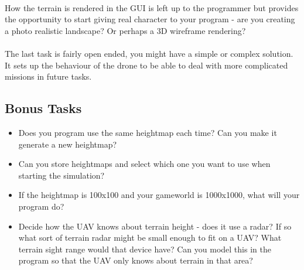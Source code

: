 \documentclass[11pt]{book}
\begin{document}
\paragraph{} How the terrain is rendered in the GUI is left up to the programmer but provides the opportunity to start giving real character to your program - are you creating a photo realistic landscape? Or perhaps a 3D wireframe rendering?

\paragraph{} The last task is fairly open ended, you might have a simple or complex solution. It sets up the behaviour of the drone to be able to deal with more complicated missions in future tasks.

\subsection{Bonus Tasks}

\begin{itemize}
\item Does you program use the same heightmap each time? Can you make it generate a new heightmap?
\item Can you store heightmaps and select which one you want to use when starting the simulation?
\item If the heightmap is 100x100 and your gameworld is 1000x1000, what will your program do?
\item Decide how the UAV knows about terrain height - does it use a radar? If so what sort of terrain radar might be small enough to fit on a UAV? What terrain sight range would that device have? Can you model this in the program so that the UAV only knows about terrain in that area?
\end{itemize}
\end{document}
